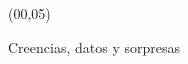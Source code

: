 \documentclass[shownotes,aspectratio=169]{beamer}
\begin{document}
\color{black!85}
\large

 

\begin{frame}
 
 \begin{textblock}{90}(00,05)
\begin{center}
 \huge  \textcolor{black!66}{Creencias, datos y sorpresas}
\end{center}
\end{textblock}

{}
\end{frame}
 
\end{document}
